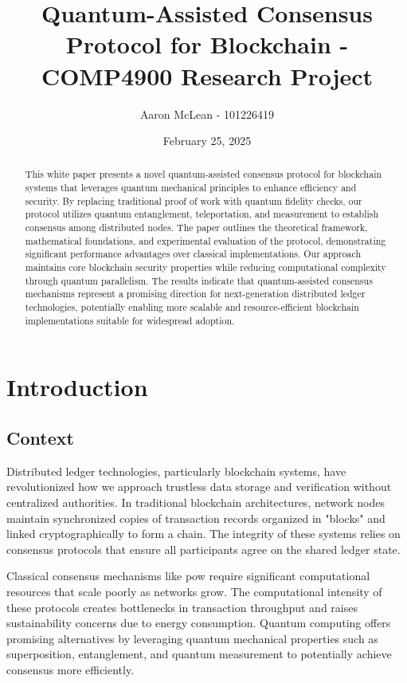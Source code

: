 \documentclass[11pt,a4paper]{article}
\title{Quantum-Assisted Consensus Protocol for Blockchain - COMP4900 Research Project}
\author{Aaron McLean - 101226419}
\date{February 25, 2025}
\begin{document}
\maketitle

\begin{abstract}
This white paper presents a novel quantum-assisted consensus protocol for blockchain systems that leverages quantum mechanical principles to enhance efficiency and security. By replacing traditional proof of work with quantum fidelity checks, our protocol utilizes quantum entanglement, teleportation, and measurement to establish consensus among distributed nodes. The paper outlines the theoretical framework, mathematical foundations, and experimental evaluation of the protocol, demonstrating significant performance advantages over classical implementations. Our approach maintains core blockchain security properties while reducing computational complexity through quantum parallelism. The results indicate that quantum-assisted consensus mechanisms represent a promising direction for next-generation distributed ledger technologies, potentially enabling more scalable and resource-efficient blockchain implementations suitable for widespread adoption.
\end{abstract}

\section{Introduction}

\subsection{Context}
Distributed ledger technologies, particularly blockchain systems, have revolutionized how we approach trustless data storage and verification without centralized authorities. In traditional blockchain architectures, network nodes maintain synchronized copies of transaction records organized in "blocks" and linked cryptographically to form a chain. The integrity of these systems relies on consensus protocols that ensure all participants agree on the shared ledger state.

Classical consensus mechanisms like \gls{pow} require significant computational resources that scale poorly as networks grow. The computational intensity of these protocols creates bottlenecks in transaction throughput and raises sustainability concerns due to energy consumption. Quantum computing offers promising alternatives by leveraging quantum mechanical properties such as superposition, \gls{entanglement}, and quantum measurement to potentially achieve consensus more efficiently.
\end{document}
